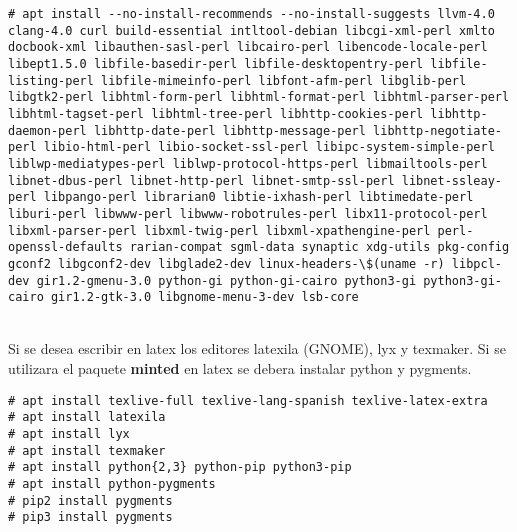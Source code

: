 \begin{verbatim}
# apt install --no-install-recommends --no-install-suggests llvm-4.0 clang-4.0 curl build-essential intltool-debian libcgi-xml-perl xmlto docbook-xml libauthen-sasl-perl libcairo-perl libencode-locale-perl libept1.5.0 libfile-basedir-perl libfile-desktopentry-perl libfile-listing-perl libfile-mimeinfo-perl libfont-afm-perl libglib-perl libgtk2-perl libhtml-form-perl libhtml-format-perl libhtml-parser-perl libhtml-tagset-perl libhtml-tree-perl libhttp-cookies-perl libhttp-daemon-perl libhttp-date-perl libhttp-message-perl libhttp-negotiate-perl libio-html-perl libio-socket-ssl-perl libipc-system-simple-perl liblwp-mediatypes-perl liblwp-protocol-https-perl libmailtools-perl libnet-dbus-perl libnet-http-perl libnet-smtp-ssl-perl libnet-ssleay-perl libpango-perl librarian0 libtie-ixhash-perl libtimedate-perl liburi-perl libwww-perl libwww-robotrules-perl libx11-protocol-perl libxml-parser-perl libxml-twig-perl libxml-xpathengine-perl perl-openssl-defaults rarian-compat sgml-data synaptic xdg-utils pkg-config gconf2 libgconf2-dev libglade2-dev linux-headers-\$(uname -r) libpcl-dev gir1.2-gmenu-3.0 python-gi python-gi-cairo python3-gi python3-gi-cairo gir1.2-gtk-3.0 libgnome-menu-3-dev lsb-core
\end{verbatim}
\\[1em]
Si se desea escribir en latex los editores latexila (GNOME), lyx y texmaker. Si se utilizara el paquete \textbf{minted} en latex se debera instalar python y pygments.
\begin{verbatim}
# apt install texlive-full texlive-lang-spanish texlive-latex-extra 
# apt install latexila
# apt install lyx
# apt install texmaker
# apt install python{2,3} python-pip python3-pip
# apt install python-pygments
# pip2 install pygments
# pip3 install pygments
\end{verbatim}
